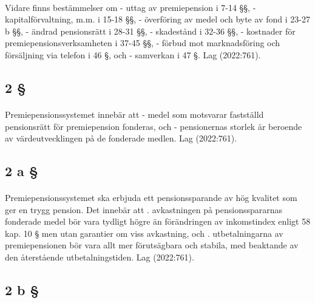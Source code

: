 \documentclass[a4paper,notitlepage,openany,10pt]{book}
\begin{document}
\paragraph*{}
Vidare finns bestämmelser om
\newline - uttag av premiepension i 7-14 §§,
\newline - kapitalförvaltning, m.m. i 15-18 §§,
\newline - överföring av medel och byte av fond i 23-27 b §§,
\newline - ändrad pensionsrätt i 28-31 §§,
\newline - skadestånd i 32-36 §§,
\newline - kostnader för premiepensionsverksamheten i 37-45 §§,
\newline - förbud mot marknadsföring och försäljning via telefon i 46 §, och
\newline - samverkan i 47 §.
Lag (2022:761).
\subsection*{2 §}
\paragraph*{}
Premiepensionssystemet innebär att
\newline - medel som motsvarar fastställd pensionsrätt för premiepension fonderas, och
\newline - pensionernas storlek är beroende av värdeutvecklingen på de fonderade medlen.
Lag (2022:761).
\subsection*{2 a §}
\paragraph*{}
Premiepensionssystemet ska erbjuda ett pensionssparande av hög kvalitet som ger en trygg pension. Det innebär att
. avkastningen på pensionsspararnas fonderade medel bör vara tydligt högre än förändringen av inkomstindex enligt 58 kap. 10 § men utan garantier om viss avkastning, och
. utbetalningarna av premiepensionen bör vara allt mer förutsägbara och stabila, med beaktande av den återstående utbetalningstiden.
Lag (2022:761).
\subsection*{2 b §}
\end{document}
